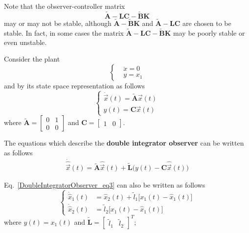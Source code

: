 \documentclass[12pt,a4paper,oneside]{book}
\begin{document}
\begin{onehalfspace}
\vspace{5mm}
Note that the observer-controller matrix
\begin{equation}
	\tilde{\mathbf{A}} - \mathbf{LC} - \tilde{\mathbf{B}}\mathbf{K} 
\end{equation} 
may or may not be stable, although 
$\tilde{\mathbf{A}}-\tilde{\mathbf{B}}\mathbf{K}$ and $\tilde{\mathbf{A}} - 
\mathbf{LC}$ are 
chosen to be stable. In fact, in some cases the matrix 
$\tilde{\mathbf{A}}-\mathbf{LC}-\tilde{\mathbf{B}}\mathbf{K}$ may 
be poorly stable or even unstable.

\vspace{5mm}
\begin{example}\label{DoubleIntegratorObserver}
Consider the plant
\begin{equation}\label{DoubleIntegratorObserver_eq1}
	\left\lbrace \begin{aligned}
		&\ddot{x}=0 \\
		&y=x_1
	\end{aligned}\right. 
\end{equation}
and by its state space representation as follows
\begin{equation}\label{DoubleIntegratorObserver_eq2}
	\left\lbrace \begin{aligned}
		\dot{\vec{x}}(t)=\tilde{\mathbf{A}}\vec{x}(t) \\[6pt]
		y(t)=\mathbf{C}\vec{x}(t)
	\end{aligned}\right. 
\end{equation}
where $\tilde{\mathbf{A}}=\begin{bmatrix} 0&1\\0&0 \end{bmatrix}$ and 
$\mathbf{C}=\begin{bmatrix} 1&0 \end{bmatrix}$.

The equations which describe the \textbf{double integrator observer} can be 
written as follows
\begin{equation}\label{DoubleIntegratorObserver_eq3}
	\begin{aligned}
		\dot{\hat{\vec{x}}}(t)=\tilde{\mathbf{A}}\hat{\vec{x}}(t)+\tilde{\mathbf{L}}\Big(y(t)-\mathbf{C}\hat{\vec{x}}(t)\Big)
	\end{aligned}
\end{equation}

Eq.~\eqref{DoubleIntegratorObserver_eq3} can also be written as follows
\begin{equation}\label{DoubleIntegratorObserver_eq4}
	\left\lbrace \begin{aligned}
		\dot{\hat{x}}_1(t) &= \hat{x}_2(t) + \tilde{l}_1\Big[x_1(t) - 
		\hat{x}_1(t)\Big] 
		\\[6pt]
		\dot{\hat{x}}_2(t) &= \tilde{l}_2\Big[x_1(t) - \hat{x}_1(t) \Big]
	\end{aligned}\right. 
\end{equation}
where $y(t) = x_1(t)$ and $\tilde{\mathbf{L}}=\begin{bmatrix} 
\tilde{l}_1&\tilde{l}_2 \end{bmatrix}^T$;


\end{example}
\end{onehalfspace}
\end{document}
